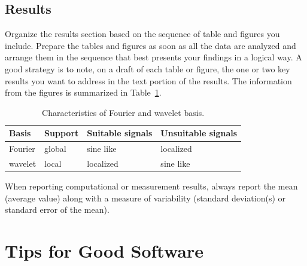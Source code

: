 \documentclass[10pt,conference,compsocconf]{IEEEtran}
\begin{document}
\subsection{Results}

Organize the results section based on the sequence of table and
figures you include. Prepare the tables and figures as soon as all
the data are analyzed and arrange them in the sequence that best
presents your findings in a logical way. A good strategy is to note,
on a draft of each table or figure, the one or two key results you
want to address in the text portion of the results.
The information from the figures is
summarized in Table~\ref{tab:fourier-wavelet}.

\begin{table}[htbp]
  \centering
  \begin{tabular}[c]{|l||l|l|l|}
    \hline
    Basis&Support&Suitable signals&Unsuitable signals\\
    \hline
    Fourier&global&sine like&localized\\
    wavelet&local&localized&sine like\\
    \hline
  \end{tabular}
  \caption{Characteristics of Fourier and wavelet basis.}
  \label{tab:fourier-wavelet}
\end{table}

When reporting computational or measurement results, always
report the mean (average value) along with a measure of variability
(standard deviation(s) or standard error of the mean).


\section{Tips for Good Software}
\label{sec:tips-software}
\end{document}
